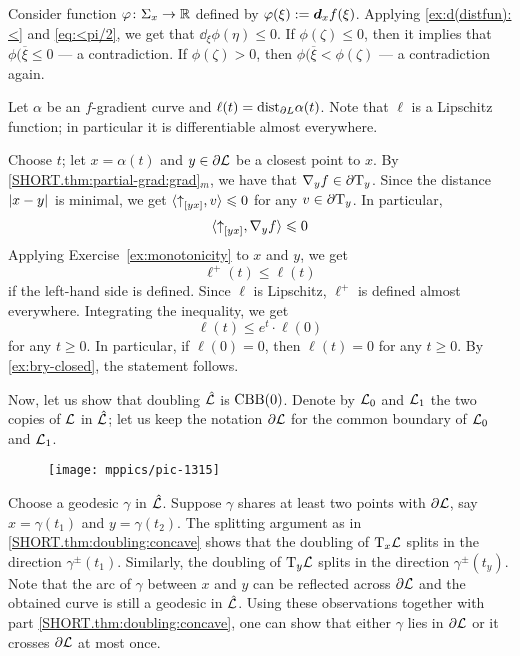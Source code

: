 Consider function $\varphi\colon\Sigma_x\to\mathbb{R}$ defined by $\varphi(\xi)\mathrel{:=}\bm{d}_xf(\xi)$.
Applying \ref{ex:d(distfun):<} and \ref{eq:<pi/2}, we get that $\dd_\xi\phi(\eta)\le 0$.
If $\phi(\zeta)\le 0$, then it implies that $\phi(\overline{\xi}\le 0$ --- a contradiction.
If $\phi(\zeta)> 0$, then $\phi(\overline{\xi}<\phi(\zeta)$ --- a contradiction again.

Let $\alpha$ be an $f$-gradient curve and $\ell(t)=\mathrm{dist}_{\partial L}\alpha(t)$.
Note that $\ell$ is a Lipschitz function;
in particular it is differentiable almost everywhere.

Choose $t$;
let $x=\alpha(t)$ and $y\in \partial\mathcal{L}$ be a closest point to $x$.
By \ref{SHORT.thm:partial-grad:grad}$_m$, we have that $\nabla_y f\in\partial \mathrm{T}_y$.
Since the distance $\dist{x}{y}{}$ is minimal, 
we get $\langle {\uparrow}_{[{y}{x}]},v\rangle\leqslant 0$ for any $v\in \partial \mathrm{T}_y$.
In particular,
\[\langle {\uparrow}_{[{y}{x}]},\nabla_y f\rangle\leqslant 0\]
Applying Exercise~\ref{ex:monotonicity} to $x$ and $y$, 
we get
\[\ell^+(t)\le \ell(t)\]
if the left-hand side is defined.
Since $\ell$ is Lipschitz, $\ell^+$ is defined almost everywhere.
Integrating the inequality, we get 
\[\ell(t)\le e^t\cdot\ell(0)\]
for any $t\ge 0$.
In particular, if $\ell(0)=0$, then $\ell(t)=0$ for any $t\ge 0$.
By \ref{ex:bry-closed}, the statement follows.

Now, let us show that doubling $\hat{\mathcal{L}}$ is $\mathrm{CBB}(0)$.
Denote by $\mathcal{L}_0$ and $\mathcal{L}_1$ the two copies of $\mathcal{L}$ in $\hat{\mathcal{L}}$;
let us keep the notation $\partial \mathcal{L}$ for the common boundary of $\mathcal{L}_0$ and $\mathcal{L}_1$.

\begin{wrapfigure}{r}{45mm}
\vskip-2mm
\centering
\texttt{[image: mppics/pic-1315]}
\end{wrapfigure}

Choose a geodesic $\gamma$ in $\hat{\mathcal{L}}$.
Suppose $\gamma$ shares at least two points with $\partial \mathcal{L}$, say $x=\gamma(t_1)$ and $y=\gamma(t_2)$.
The splitting argument as in \ref{SHORT.thm:doubling:concave} shows that the doubling of $\mathrm{T}_x\mathcal{L}$ splits in the direction $\gamma^\pm(t_1)$.
Similarly, the doubling of $\mathrm{T}_y\mathcal{L}$ splits in the direction $\gamma^\pm(t_y)$.
Note that the arc of $\gamma$ between $x$ and $y$ can be reflected across $\partial \mathcal{L}$ and the obtained curve is still a geodesic in $\hat{\mathcal{L}}$.
Using these observations together with part \ref{SHORT.thm:doubling:concave}, one can show that either $\gamma$ lies in $\partial \mathcal{L}$ or it crosses $\partial \mathcal{L}$ at most once.

